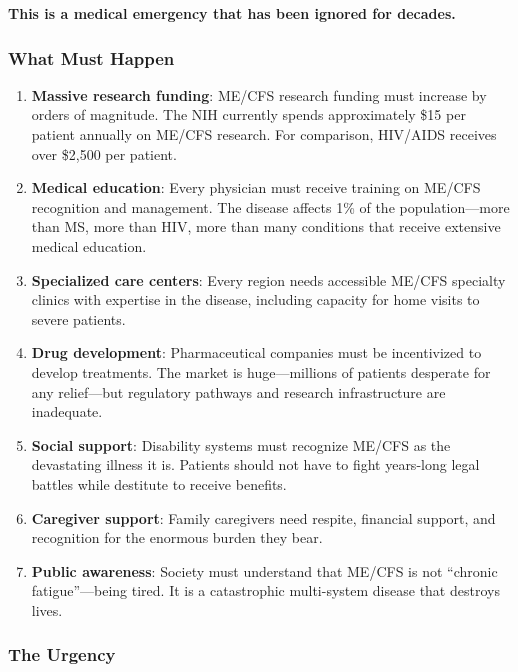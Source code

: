 \textbf{This is a medical emergency that has been ignored for decades.}

\subsubsection{What Must Happen}
\label{subsec:what-must-happen}

\begin{enumerate}
    \item \textbf{Massive research funding}: ME/CFS research funding must increase by orders of magnitude. The NIH currently spends approximately \$15 per patient annually on ME/CFS research. For comparison, HIV/AIDS receives over \$2,500 per patient.

    \item \textbf{Medical education}: Every physician must receive training on ME/CFS recognition and management. The disease affects 1\% of the population---more than MS, more than HIV, more than many conditions that receive extensive medical education.

    \item \textbf{Specialized care centers}: Every region needs accessible ME/CFS specialty clinics with expertise in the disease, including capacity for home visits to severe patients.

    \item \textbf{Drug development}: Pharmaceutical companies must be incentivized to develop treatments. The market is huge---millions of patients desperate for any relief---but regulatory pathways and research infrastructure are inadequate.

    \item \textbf{Social support}: Disability systems must recognize ME/CFS as the devastating illness it is. Patients should not have to fight years-long legal battles while destitute to receive benefits.

    \item \textbf{Caregiver support}: Family caregivers need respite, financial support, and recognition for the enormous burden they bear.

    \item \textbf{Public awareness}: Society must understand that ME/CFS is not ``chronic fatigue''---being tired. It is a catastrophic multi-system disease that destroys lives.
\end{enumerate}

\subsubsection{The Urgency}
\label{subsec:urgency}

